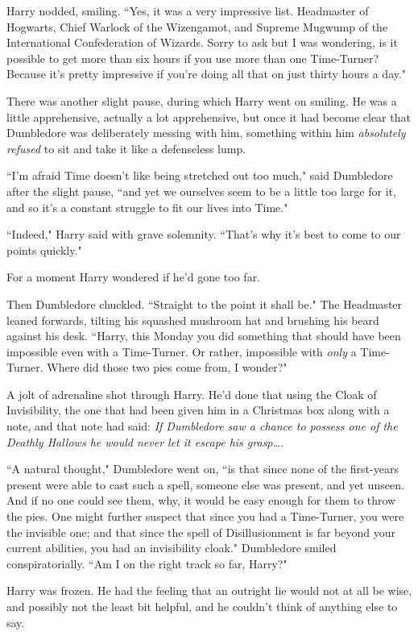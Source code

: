 Harry nodded, smiling. ``Yes, it was a very impressive list. Headmaster of Hogwarts, Chief Warlock of the Wizengamot, and Supreme Mugwump of the International Confederation of Wizards. Sorry to ask but I was wondering, is it possible to get more than six hours if you use more than one Time-Turner? Because it's pretty impressive if you're doing all that on just thirty hours a day."

There was another slight pause, during which Harry went on smiling. He was a little apprehensive, actually a lot apprehensive, but once it had become clear that Dumbledore was deliberately messing with him, something within him \emph{absolutely refused} to sit and take it like a defenseless lump.

``I'm afraid Time doesn't like being stretched out too much," said Dumbledore after the slight pause, ``and yet we ourselves seem to be a little too large for it, and so it's a constant struggle to fit our lives into Time."

``Indeed," Harry said with grave solemnity. ``That's why it's best to come to our points quickly."

For a moment Harry wondered if he'd gone too far.

Then Dumbledore chuckled. ``Straight to the point it shall be." The Headmaster leaned forwards, tilting his squashed mushroom hat and brushing his beard against his desk. ``Harry, this Monday you did something that should have been impossible even with a Time-Turner. Or rather, impossible with \emph{only} a Time-Turner. Where did those two pies come from, I wonder?"

A jolt of adrenaline shot through Harry. He'd done that using the Cloak of Invisibility, the one that had been given him in a Christmas box along with a note, and that note had said: \emph{If Dumbledore saw a chance to possess one of the Deathly Hallows he would never let it escape his grasp{\ldots}.}

``A natural thought," Dumbledore went on, ``is that since none of the first-years present were able to cast such a spell, someone else was present, and yet unseen. And if no one could see them, why, it would be easy enough for them to throw the pies. One might further suspect that since you had a Time-Turner, you were the invisible one; and that since the spell of Disillusionment is far beyond your current abilities, you had an invisibility cloak." Dumbledore smiled conspiratorially. ``Am I on the right track so far, Harry?"

Harry was frozen. He had the feeling that an outright lie would not at all be wise, and possibly not the least bit helpful, and he couldn't think of anything else to say.

